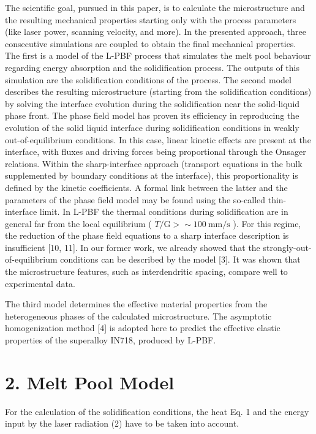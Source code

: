 \documentclass[10pt]{article}
\begin{document}
The scientific goal, pursued in this paper, is to calculate the microstructure and the resulting mechanical properties starting only with the process parameters (like laser power, scanning velocity, and more). In the presented approach, three consecutive simulations are coupled to obtain the final mechanical properties. The first is a model of the L-PBF process that simulates the melt pool behaviour regarding energy absorption and the solidification process. The outputs of this simulation are the solidification conditions of the process. The second model describes the resulting microstructure (starting from the solidification conditions) by solving the interface evolution during the solidification near the solid-liquid phase front. The phase field model has proven its efficiency in reproducing the evolution of the solid liquid interface during solidification conditions in weakly out-of-equilibrium conditions. In this case, linear kinetic effects are present at the interface, with fluxes and driving forces being proportional through the Onsager relations. Within the sharp-interface approach (transport equations in the bulk supplemented by boundary conditions at the interface), this proportionality is defined by the kinetic coefficients. A formal link between the latter and the parameters of the phase field model may be found using the so-called thin-interface limit. In L-PBF the thermal conditions during solidification are in general far from the local equilibrium ( $\dot{T} / \mathrm{G}>\sim 100 \mathrm{~mm} / \mathrm{s}$ ). For this regime, the reduction of the phase field equations to a sharp interface description is insufficient [10, 11]. In our former work, we already showed that the strongly-out-of-equilibrium conditions can be described by the model [3]. It was shown that the microstructure features, such as interdendritic spacing, compare well to experimental data.

The third model determines the effective material properties from the heterogeneous phases of the calculated microstructure. The asymptotic homogenization method [4] is adopted here to predict the effective elastic properties of the superalloy IN718, produced by L-PBF.

\section*{2. Melt Pool Model}
For the calculation of the solidification conditions, the heat Eq. 1 and the energy input by the laser radiation (2) have to be taken into account.
\end{document}
